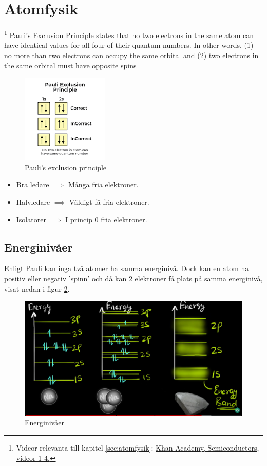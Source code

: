 \section{Atomfysik} 



\footnote{Videor relevanta till kapitel \ref{sec:atomfysik}: \href{https://www.youtube.com/playlist?list=PL2ub1_oKCn7ogaMtdB2RumlIYqNeXf_oX}{Khan Academy, Semiconductors, videor 1-4.}}
\label{sec:atomfysik}
Pauli's Exclusion Principle states that no two electrons in the same atom can have identical values for all four of their quantum numbers. In other words, (1) no more than two electrons can occupy the same orbital and (2) two electrons in the same orbital must have opposite spins

\begin{figure}[ht]
    \centering
    \includegraphics{bilder/fig:pauli.png}
    \caption{Pauli's exclusion principle}
    \label{fig:paulis}
\end{figure}

\begin{itemize}
    \item Bra ledare $\implies$ Många fria elektroner.
    \item Halvledare $\implies$ Väldigt få fria elektroner.
    \item Isolatorer $\implies$ I princip 0 fria elektroner.
\end{itemize} 

\subsection{Energinivåer}
Enligt Pauli kan inga två atomer ha samma energinivå. Dock kan en atom ha positiv eller negativ 'spinn' och då kan 2 elektroner få plats på samma energinivå, visat nedan i figur \ref{fig:Energinivåer}.

\begin{figure}[ht]
    \centering
    \includegraphics[scale = 0.3]{bilder/fig:energi.png}
    \caption{Energinivåer}
    \label{fig:Energinivåer}
\end{figure}

